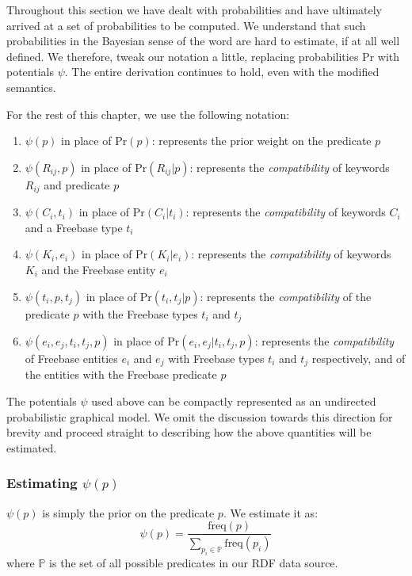 \documentclass[a4paper, twoside, 12pt]{report}
\begin{document}
Throughout this section we have dealt with probabilities and have ultimately arrived at a set of probabilities to be computed. We understand that such probabilities in the Bayesian sense of the word are hard to estimate, if at all well defined. We therefore, tweak our notation a little, replacing probabilities $\text{Pr}$ with potentials $\psi$. The entire derivation continues to hold, even with the modified semantics. 

For the rest of this chapter, we use the following notation:
\begin{enumerate}
  \item $\psi(p)$ in place of $\text{Pr}(p)$: represents the prior weight on the predicate $p$
  \item $\psi(R_{ij}, p)$ in place of $\text{Pr}(R_{ij}|p)$: represents the \emph{compatibility} of keywords $R_{ij}$ and predicate $p$
  \item $\psi(C_i, t_i)$ in place of $\text{Pr}(C_i|t_i)$: represents the \emph{compatibility} of keywords $C_i$ and a Freebase type $t_i$
  \item $\psi(K_i, e_i)$ in place of $\text{Pr}(K_i|e_i)$: represents the \emph{compatibility} of keywords $K_i$ and the Freebase entity $e_i$
  \item $\psi(t_i, p, t_j)$ in place of $\text{Pr}(t_i, t_j|p)$: represents the \emph{compatibility} of the predicate $p$ with the Freebase types $t_i$ and $t_j$
  \item $\psi(e_i, e_j, t_i, t_j, p)$ in place of $\text{Pr}(e_i, e_j | t_i, t_j, p)$: represents the \emph{compatibility} of Freebase entities $e_i$ and $e_j$ with Freebase types $t_i$ and $t_j$ respectively, and of the entities with the Freebase predicate $p$
\end{enumerate}

The potentials $\psi$ used above can be compactly represented as an undirected probabilistic graphical model. We omit the discussion towards this direction for brevity and proceed straight to describing how the above quantities will be estimated.

\subsubsection{Estimating $\psi(p)$}
$\psi(p)$ is simply the prior on the predicate $p$. We estimate it as:
$$\psi(p) = \frac{\text{freq}(p)}{\sum_{p_i \in \mathbb{P}}\text{freq}(p_i)}$$
where $\mathbb{P}$ is the set of all possible predicates in our RDF data source. 
\end{document}
